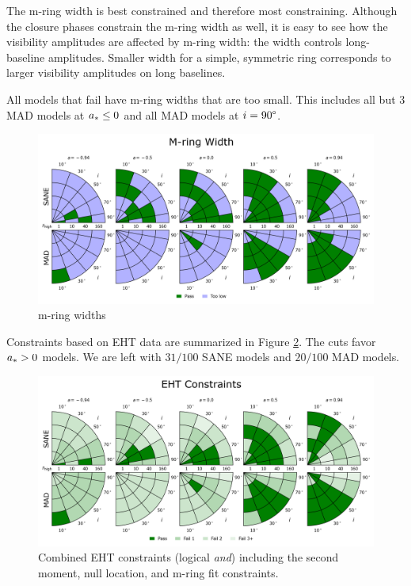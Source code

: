 The m-ring width is best constrained and therefore most constraining.  Although the closure phases constrain the m-ring width as well, it is easy to see how the visibility amplitudes are affected by m-ring width: the width controls long-baseline amplitudes. Smaller width for a simple, symmetric ring corresponds to larger visibility amplitudes on long baselines.  

All models that fail have m-ring widths that are too small.  This includes all but 3 MAD models at $a_* \le 0$ and all MAD models at $i = 90\degree$.

\begin{figure}
  \centering
  \includegraphics[width=\columnwidth]{./figures/Mring_w_Constraints.png}
  \caption{m-ring widths}
  \label{fig:cmp_m-ring_width}
\end{figure}


Constraints based on EHT data are summarized in Figure \ref{fig:all_EHT_constraints}.  The cuts favor $a_* > 0$ models.  We are left with $31/100$ SANE models and $20/100$ MAD models.

\begin{figure}
  \centering
    \includegraphics[width=\columnwidth]{./figures/Interferometric_Constraints.png}
  \caption{Combined EHT constraints (logical {\em and}) including the second moment, null location, and m-ring fit constraints.}
  \label{fig:all_EHT_constraints}
\end{figure}

